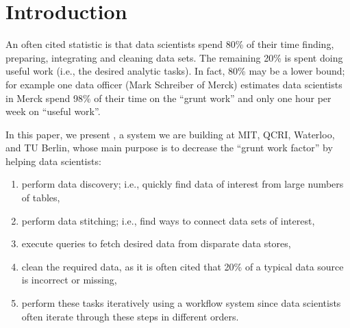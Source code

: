 \section{Introduction}
\label{introduction}

An often cited statistic is that data scientists spend 80\% of their time finding, preparing, integrating and cleaning data sets. The remaining 20\% is spent doing useful work (i.e., the desired analytic tasks). In fact, 80\% may be a lower bound; for example one data officer (Mark Schreiber of Merck) estimates data scientists in Merck spend 98\% of their time on the ``grunt work'' and only one hour per week on ``useful work''.

In this paper, we present \dcv, a system we are building at MIT, QCRI, Waterloo, and TU Berlin, whose main purpose is to decrease the ``grunt work factor'' by helping data scientists:



\begin{enumerate}[label=\roman*)]

\item perform data discovery; i.e., quickly find data of interest from large numbers of tables,


\item perform data stitching; i.e., find ways to connect data sets of interest,

\item execute queries to fetch desired data from disparate data stores,


\item clean the required data, as it is often cited that 20\% of a typical data source is incorrect or missing,


\item perform these tasks iteratively using a workflow system since data scientists often iterate through these steps in different orders.

\end{enumerate}

